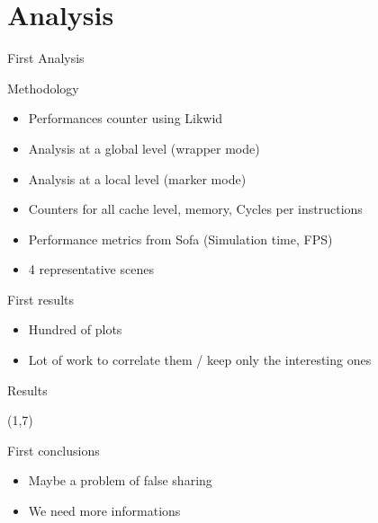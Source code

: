 \documentclass[xcolor={usenames,dvipsnames}]{beamer}
\newcommand{\sectiontitle}{}
\newcommand{\newsection}[1]{\renewcommand{\sectiontitle}{#1}\section{#1}}
\begin{document}
\newsection{Analysis}

\begin{frame}{First Analysis}
    \begin{block}{Methodology}
        \begin{itemize}
            \item Performances counter using Likwid \citep{Treibig10LIKWID}
            \item Analysis at a global level (wrapper mode)
            \item Analysis at a local level (marker mode)
            \item Counters for all cache level, memory, Cycles per instructions
            \item Performance metrics from Sofa (Simulation time, FPS)
            \item 4 representative scenes
        \end{itemize}
    \end{block}
    \pause
    \begin{exampleblock}{First results}
        \begin{itemize}
            \item Hundred of plots
            \item Lot of work to correlate them / keep only the interesting ones
        \end{itemize}
    \end{exampleblock}
\end{frame}

\begin{frame}{Results}

    {
        \begin{textblock}{14}(1,7)
            \begin{alertblock}{First conclusions}
                \begin{itemize}
                    \item Maybe a problem of false sharing
                    \item We need more informations
                \end{itemize}
            \end{alertblock}
        \end{textblock}
    }
\end{frame}
\end{document}
